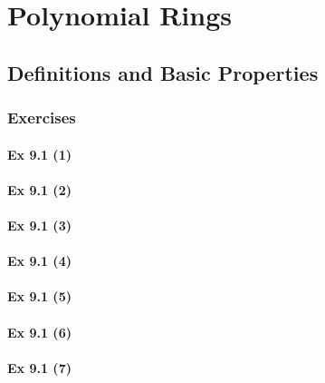 \setcounter{chapter}{0}
\renewcommand{\thechapter}{9}
\chapter{Polynomial Rings}\label{ch:9}
\setcounter{equation}{0}	        %

\section{Definitions and Basic Properties}\label{sec:9.1}	
\subsection*{Exercises}\label{sec:9.1_Exercises}

\subsubsection{Ex 9.1 (1)}\label{sec:Ex_9.1.1}

\subsubsection{Ex 9.1 (2)}\label{sec:Ex_9.1.2}

\subsubsection{Ex 9.1 (3)}\label{sec:Ex_9.1.3}

\subsubsection{Ex 9.1 (4)}\label{sec:Ex_9.1.4}

\subsubsection{Ex 9.1 (5)}\label{sec:Ex_9.1.5}

\subsubsection{Ex 9.1 (6)}\label{sec:Ex_9.1.6}

\subsubsection{Ex 9.1 (7)}\label{sec:Ex_9.1.7}

